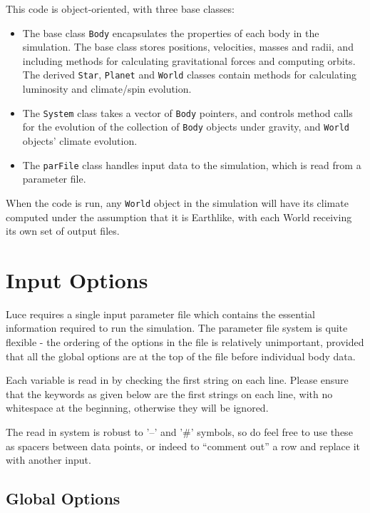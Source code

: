 \documentclass[usenatbib,11pt]{article}
\begin{document}
This code is object-oriented, with three base classes:

\begin{itemize}

\item The base class \texttt{Body} encapsulates the properties of each body in the simulation.  The base class stores positions, velocities, masses and radii, and including methods for calculating gravitational forces and computing orbits.  The derived \texttt{Star}, \texttt{Planet} and \texttt{World} classes contain methods for calculating luminosity and climate/spin evolution.

\item The \texttt{System} class takes a vector of \texttt{Body} pointers, and controls method calls for the evolution of the collection of \texttt{Body} objects under gravity, and \texttt{World} objects' climate evolution.

\item The \texttt{parFile} class handles input data to the simulation, which is read from a parameter file.

\end{itemize}

When the code is run, any \texttt{World} object in the simulation will have its climate computed under the assumption that it is Earthlike, with each World receiving its own set of output files.

\section{Input Options}

\noindent Luce requires a single input parameter file which contains the essential information required to run the simulation.  The parameter file system is quite flexible - the ordering of the options in the file is relatively unimportant, provided that all the global options are at the top of the file before individual body data.

Each variable is read in by checking the first string on each line.  Please ensure that the keywords as given below are the first strings on each line, with no whitespace at the beginning, otherwise they will be ignored.  

The read in system is robust to '--' and '\#' symbols, so do feel free to use these as spacers between data points, or indeed to ``comment out'' a row and replace it with another input. 

\subsection{Global Options}
\end{document}
